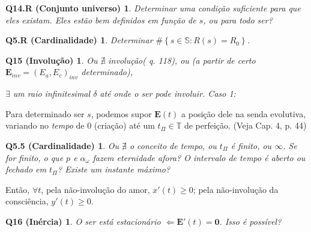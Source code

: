 \documentclass[12pt,a4paper]{article}
\begin{document}
			\newtheorem{Q14.R}{Q14.R (Conjunto universo)}
			\begin{Q14.R} Determinar uma condi\c{c}\~ao suficiente para que eles existam. Eles est\~ao bem definidos em fun\c{c}\~ao de $s$, ou para todo ser?
			\end{Q14.R}

			\newtheorem{Q5.R}{Q5.R (Cardinalidade)}
			\begin{Q5.R} Determinar $ \#\left\{s \in \mathbb{S} : R(s) = R_0 \right\}$.
			\end{Q5.R}

			\newtheorem{Q15}{Q15 (Involu\c{c}\~ao)}\label{involution}
			\begin{Q15}
				Ou $ \nexists $ involu\c{c}\~ao\footnotemark[1] (\cite{le} q. 118), ou (a partir de certo $ \mathbf{E}_{inv} = (E_a, E_c)_{inv}$ determinado),

				$ \exists $ um raio infinitesimal $ \delta $ at\'e onde o ser pode involuir. Caso 1:
			\end{Q15}


			Para determinado ser $s$, podemos supor $ \mathbf{E}(t) $  a posi\c{c}\~ao dele na senda evolutiva, variando no \emph{tempo} de 0 (cria\c{c}\~ao) at\'e um $ t_\Pi \in \mathbb{T} $ de perfei\c{c}\~ao. (Veja \cite{brennan} Cap. 4, p. 44)

			\newtheorem{Q5.5}{Q5.5 (Cardinalidade)}
			\begin{Q5.5} Ou $ \nexists $ o conceito de tempo, ou $ t_\Pi $ \'e finito, ou $ \infty $\footnotemark[2]. Se for finito, o que $p$ e $ \alpha_\omega $ fazem eternidade afora? O intervalo de tempo \'e aberto ou fechado em $ t_\Pi $? Existe um instante m\'aximo?
			\end{Q5.5}


			Ent\~ao, $\forall t$, pela n\~ao-involu\c{c}\~ao do amor, $ x'(t) \ge 0 $; pela n\~ao-involu\c{c}\~ao da consci\^encia, $ y'(t) \ge 0 $.

			\newtheorem{Q16}{Q16 (In\'ercia)}
			\begin{Q16} O ser est\'a estacion\'ario $ \Leftarrow \mathbf{E}'(t) = \mathbf{0} $. Isso \'e poss\'ivel?
			\end{Q16}
\end{document}
